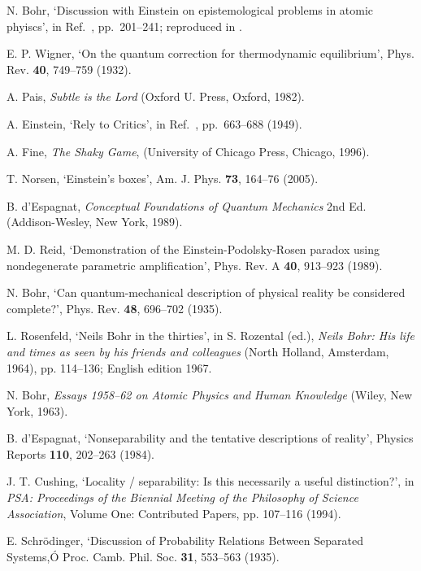 \documentclass[12pt]{iopart}
\begin{document}
\begin{thebibliography}{10}
 N. Bohr, `Discussion with Einstein on epistemological problems in atomic phyiscs', in Ref.~\cite{Sch49}, pp.~201--241; reproduced in \cite{WheZur83}.

E. P. Wigner, `On the quantum correction for thermodynamic
equilibrium', Phys. Rev. {\bf 40}, 749--759 (1932).

A. Pais,
{\em Subtle is the Lord}
(Oxford U. Press, Oxford, 1982).

A. Einstein, `Rely to Critics', 
in Ref.~\cite{Sch49}, pp.~663--688 (1949).

A. Fine, {\em The
Shaky Game}, (University of Chicago Press, Chicago, 1996).

T. Norsen, `Einstein's boxes', Am. J. Phys. {\bf 73}, 164--76 (2005).

B. d'Espagnat, {\em Conceptual Foundations of Quantum Mechanics} 2nd Ed.
(Addison-Wesley, New York, 1989).

M. D. Reid, 
`Demonstration of the Einstein-Podolsky-Rosen paradox using nondegenerate parametric amplification',
Phys. Rev. A {\bf 40}, 913--923 (1989).

N. Bohr, `Can quantum-mechanical description of physical reality be
considered complete?', Phys. Rev. {\bf 48}, 696--702 (1935).

L. Rosenfeld, `Neils Bohr in the thirties', in S. Rozental (ed.),
{\em Neils Bohr: His life and times as seen by his friends and
colleagues} (North Holland, Amsterdam, 1964), pp. 114--136; English
edition 1967.

N. Bohr, {\em Essays 1958--62 on Atomic Physics and Human Knowledge}
(Wiley, New York, 1963).

B. d'Espagnat, `Nonseparability and the tentative descriptions of
reality', Physics Reports {\bf 110}, 202--263 (1984).

J. T. Cushing, `Locality / separability: Is this necessarily a
useful distinction?', in {\em PSA: Proceedings of the Biennial
Meeting of the Philosophy of Science Association}, Volume One:
Contributed Papers, pp. 107--116 (1994).

 E. Schr\"odinger, `Discussion of Probability Relations Between
Separated Systems,Ó Proc. Camb. Phil. Soc. {\bf 31},
553--563 (1935). %


\end{thebibliography}
\end{document}
